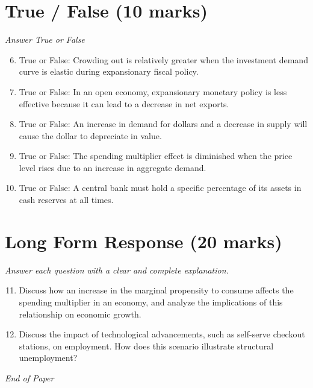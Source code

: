 \documentclass[12pt]{article}
\begin{document}
\section*{True / False (10 marks)}
\textit{Answer True or False}
\begin{enumerate}[label=\arabic*.]
\setcounter{enumi}{5}
\item True or False: Crowding out is relatively greater when the investment demand curve is elastic during expansionary fiscal policy.
\item True or False: In an open economy, expansionary monetary policy is less effective because it can lead to a decrease in net exports.
\item True or False: An increase in demand for dollars and a decrease in supply will cause the dollar to depreciate in value.
\item True or False: The spending multiplier effect is diminished when the price level rises due to an increase in aggregate demand.
\item True or False: A central bank must hold a specific percentage of its assets in cash reserves at all times.
\end{enumerate}

\section*{Long Form Response (20 marks)}
\textit{Answer each question with a clear and complete explanation.}
\begin{enumerate}[label=\arabic*.]
\setcounter{enumi}{10}
\item Discuss how an increase in the marginal propensity to consume affects the spending
multiplier in an economy, and analyze the implications of this relationship on economic
growth.
\item Discuss the impact of technological advancements, such as self-serve checkout stations, on
employment. How does this scenario illustrate structural unemployment?
\end{enumerate}

\vfill
\noindent\textit{End of Paper}
\end{document}
